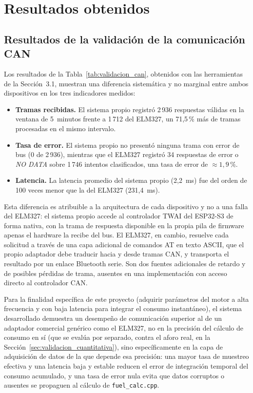 \section{Resultados obtenidos}

\subsection{Resultados de la validación de la comunicación CAN}

Los resultados de la Tabla~\ref{tab:validacion_can}, obtenidos con las herramientas de la Sección~3.1, muestran una diferencia sistemática y no marginal entre ambos dispositivos en los tres indicadores medidos:

\begin{itemize}
	\item \textbf{Tramas recibidas.} El sistema propio registró 2\,936 respuestas válidas en la ventana de 5~minutos frente a 1\,712 del ELM327, un 71,5\,\% más de tramas procesadas en el mismo intervalo.
	\item \textbf{Tasa de error.} El sistema propio no presentó ninguna trama con error de bus (0 de 2\,936), mientras que el ELM327 registró 34 respuestas de error o \textit{NO DATA} sobre 1\,746 intentos clasificados, una tasa de error de $\approx 1{,}9\,\%$.
	\item \textbf{Latencia.} La latencia promedio del sistema propio (2,2~ms) fue del orden de 100 veces menor que la del ELM327 (231,4~ms).
\end{itemize}

Esta diferencia es atribuible a la arquitectura de cada dispositivo y no a una falla del ELM327: el sistema propio accede al controlador TWAI del ESP32-S3 de forma nativa, con la trama de respuesta disponible en la propia pila de firmware apenas el hardware la recibe del bus. El ELM327, en cambio, resuelve cada solicitud a través de una capa adicional de comandos AT en texto ASCII, que el propio adaptador debe traducir hacia y desde tramas CAN, y transporta el resultado por un enlace Bluetooth serie. Son dos fuentes adicionales de retardo y de posibles pérdidas de trama, ausentes en una implementación con acceso directo al controlador CAN.

Para la finalidad específica de este proyecto (adquirir parámetros del motor a alta frecuencia y con baja latencia para integrar el consumo instantáneo), el sistema desarrollado demuestra un desempeño de comunicación superior al de un adaptador comercial genérico como el ELM327, no en la precisión del cálculo de consumo en sí (que se evalúa por separado, contra el aforo real, en la Sección~\ref{sec:validacion_cuantitativa}), sino específicamente en la capa de adquisición de datos de la que depende esa precisión: una mayor tasa de muestreo efectiva y una latencia baja y estable reducen el error de integración temporal del consumo acumulado, y una tasa de error nula evita que datos corruptos o ausentes se propaguen al cálculo de \texttt{fuel\_calc.cpp}.

